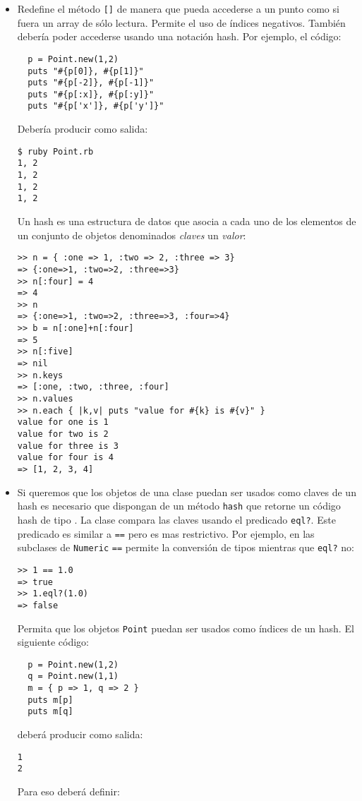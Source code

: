 \begin{itemize}
\item
Redefine el método \verb|[]| de manera que pueda accederse a un punto como si fuera un array
de sólo lectura.
Permite el uso de índices negativos.
También debería poder accederse usando una notación hash. Por ejemplo, el código:
\begin{verbatim}
  p = Point.new(1,2)
  puts "#{p[0]}, #{p[1]}"
  puts "#{p[-2]}, #{p[-1]}"
  puts "#{p[:x]}, #{p[:y]}"
  puts "#{p['x']}, #{p['y']}"
\end{verbatim}
Debería producir como salida:
\begin{verbatim}
$ ruby Point.rb 
1, 2
1, 2
1, 2
1, 2
\end{verbatim}
Un hash es una estructura de datos que asocia a cada uno de los elementos de un conjunto de objetos
denominados {\it claves}  un {\it valor}:
\begin{verbatim}
>> n = { :one => 1, :two => 2, :three => 3}
=> {:one=>1, :two=>2, :three=>3}
>> n[:four] = 4
=> 4
>> n
=> {:one=>1, :two=>2, :three=>3, :four=>4}
>> b = n[:one]+n[:four]
=> 5
>> n[:five]
=> nil
>> n.keys
=> [:one, :two, :three, :four]
>> n.values
>> n.each { |k,v| puts "value for #{k} is #{v}" }
value for one is 1
value for two is 2
value for three is 3
value for four is 4
=> [1, 2, 3, 4]
\end{verbatim}
\item
Si queremos que los objetos de una clase 
puedan ser usados como claves de un hash es necesario que dispongan de un método \verb|hash|
que retorne un código hash de tipo .
La clase  compara las claves 
usando el predicado \verb|eql?|. Este predicado es similar a \verb|==| 
pero es mas restrictivo. Por ejemplo, en las subclases de \verb|Numeric|
\verb|==| permite la conversión de tipos mientras que \verb|eql?| no:
\begin{verbatim}
>> 1 == 1.0
=> true
>> 1.eql?(1.0)
=> false
\end{verbatim}
Permita que los objetos \verb|Point| puedan ser usados como índices de un hash.
El siguiente código:
\begin{verbatim}
  p = Point.new(1,2)
  q = Point.new(1,1)
  m = { p => 1, q => 2 } 
  puts m[p]
  puts m[q]
\end{verbatim}
deberá producir como salida:
\begin{verbatim}
1
2
\end{verbatim}
Para eso deberá definir:
\begin{itemize}

\end{itemize}
\end{itemize}
